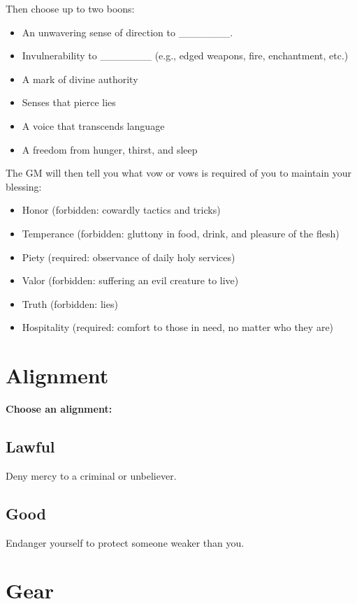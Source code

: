  Then choose up to two boons:
\begin{itemize}
\item An unwavering sense of direction to \_\_\_\_\_\_\_.
\item Invulnerability to \_\_\_\_\_\_\_ (e.g., edged weapons, fire, enchantment, etc.)
\item A mark of divine authority
\item Senses that pierce lies
\item A voice that transcends language
\item A freedom from hunger, thirst, and sleep

\end{itemize}


 The GM will then tell you what vow or vows is required of you to maintain your blessing:
\begin{itemize}
\item Honor (forbidden: cowardly tactics and tricks)
\item Temperance (forbidden: gluttony in food, drink, and pleasure of the flesh)
\item Piety (required: observance of daily holy services)
\item Valor (forbidden: suffering an evil creature to live)
\item Truth (forbidden: lies)
\item Hospitality (required: comfort to those in need, no matter who they are)

\end{itemize}
\section*{Alignment}


{\bfseries Choose an alignment:}
\subsection{Lawful}


 Deny mercy to a criminal or unbeliever.
\subsection{Good}


 Endanger yourself to protect someone weaker than you.
\section*{Gear}


